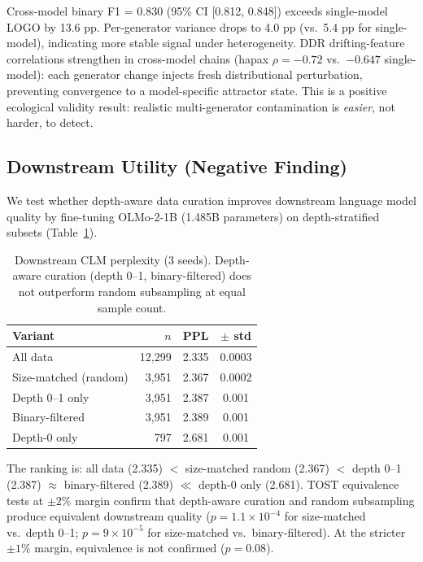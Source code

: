 \documentclass[11pt,twocolumn]{article}
\begin{document}
Cross-model binary F1 = 0.830 (95\% CI [0.812, 0.848]) exceeds single-model LOGO by 13.6 pp.
Per-generator variance drops to 4.0 pp (vs.\ 5.4 pp for single-model), indicating more stable signal under heterogeneity.
DDR drifting-feature correlations strengthen in cross-model chains (hapax $\rho = -0.72$ vs.\ $-0.647$ single-model): each generator change injects fresh distributional perturbation, preventing convergence to a model-specific attractor state.
This is a positive ecological validity result: realistic multi-generator contamination is \emph{easier}, not harder, to detect.

\subsection{Downstream Utility (Negative Finding)}
\label{sec:downstream}

We test whether depth-aware data curation improves downstream language model quality by fine-tuning OLMo-2-1B (1.485B parameters) on depth-stratified subsets (Table~\ref{tab:downstream}).

\begin{table}[t]
\centering
\small
\begin{tabular}{lrcc}
\toprule
\textbf{Variant} & $n$ & \textbf{PPL} & \textbf{$\pm$ std} \\
\midrule
All data & 12,299 & 2.335 & 0.0003 \\
Size-matched (random) & 3,951 & 2.367 & 0.0002 \\
Depth 0--1 only & 3,951 & 2.387 & 0.001 \\
Binary-filtered & 3,951 & 2.389 & 0.001 \\
Depth-0 only & 797 & 2.681 & 0.001 \\
\bottomrule
\end{tabular}
\caption{Downstream CLM perplexity (3 seeds). Depth-aware curation (depth 0--1, binary-filtered) does not outperform random subsampling at equal sample count.}
\label{tab:downstream}
\end{table}

The ranking is: all data (2.335) $<$ size-matched random (2.367) $<$ depth 0--1 (2.387) $\approx$ binary-filtered (2.389) $\ll$ depth-0 only (2.681).
TOST equivalence tests at $\pm 2\%$ margin confirm that depth-aware curation and random subsampling produce equivalent downstream quality ($p = 1.1 \times 10^{-4}$ for size-matched vs.\ depth 0--1; $p = 9 \times 10^{-5}$ for size-matched vs.\ binary-filtered).
At the stricter $\pm 1\%$ margin, equivalence is not confirmed ($p = 0.08$).
\end{document}
